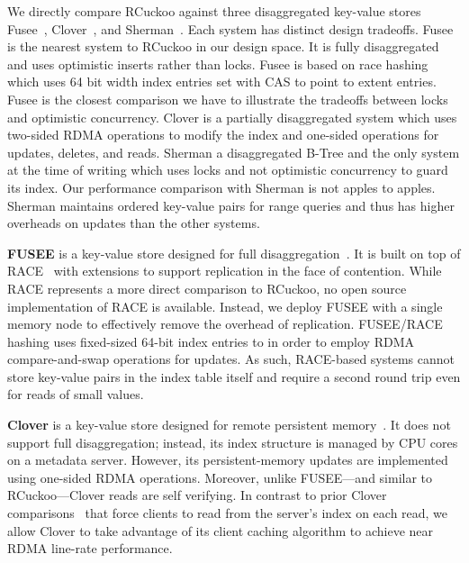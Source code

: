 We directly compare RCuckoo against three disaggregated
key-value stores Fusee~\cite{fusee}, Clover~\cite{clover},
and Sherman~\cite{sherman}. Each system has distinct design
tradeoffs. 
Fusee is the nearest system to RCuckoo in our design space.
It is fully disaggregated and uses optimistic inserts rather
than locks. Fusee is based on race hashing which uses 64 bit
width index entries set with CAS to point to extent entries.
Fusee is the closest comparison we have to illustrate the
tradeoffs between locks and optimistic concurrency.
Clover is a partially disaggregated system which uses
two-sided RDMA operations to modify the index and one-sided
operations for updates, deletes, and reads.
Sherman a disaggregated B-Tree and the only system at the
time of writing which uses locks and not optimistic
concurrency to guard its index. Our performance comparison
with Sherman is not apples to apples. Sherman maintains
ordered key-value pairs for range queries and thus has
higher overheads on updates than the other systems.

\textbf{FUSEE}
is a key-value store designed for full
disaggregation~\cite{fusee}.  It is built on top of RACE~\cite{race}
with extensions to support replication in the face of contention.
While RACE represents a more direct comparison to RCuckoo, no open
source implementation of RACE is available.  Instead, we deploy FUSEE
with a single memory node to effectively remove the overhead of
replication.  FUSEE/RACE hashing uses fixed-sized 64-bit index entries
to in order to employ RDMA compare-and-swap operations for updates. As
such, RACE-based systems cannot store key-value pairs in the index
table itself and require a second round trip even for reads of small values.

\textbf{Clover}
is a key-value store designed for remote persistent memory~\cite{clover}. It
does not support full disaggregation; instead, its index structure is
managed by CPU cores on a metadata server. However, its
persistent-memory updates are implemented using one-sided RDMA
operations.  Moreover, unlike FUSEE---and similar to RCuckoo---Clover
reads are self verifying.
In contrast to prior Clover comparisons~\cite{fusee} that force
clients to read from the server's index on each read, we allow Clover
to take advantage of its client caching algorithm to achieve near
RDMA line-rate performance.

